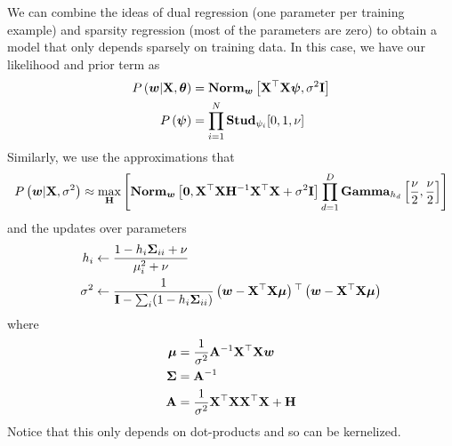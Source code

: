 We can combine the ideas of dual regression (one parameter per training example) and sparsity regression (most of the parameters are zero) to obtain a model that only depends sparsely on training data. In this case, we have our likelihood and prior term as
\begin{align*}
	P\left(\boldsymbol{w}|\mathbf{X},\boldsymbol{\theta}\right)&=\mathbf{Norm}_{\boldsymbol{w}}\left[\mathbf{X}^\top\mathbf{X}\boldsymbol{\psi},\sigma^2\mathbf{I}\right] \\
	P\left(\boldsymbol{\psi}\right)&=\prod_{i=1}^N\mathbf{Stud}_{\psi_i}[0,1,\nu]
\end{align*}
Similarly, we use the approximations that
\begin{align*}
	P\left(\boldsymbol{w}|\mathbf{X},\sigma^2\right)\approx\max_{\mathbf{H}}\left[\mathbf{Norm}_{\boldsymbol{w}}\left[\boldsymbol{0},\mathbf{X}^\top\mathbf{X}\mathbf{H}^{-1}\mathbf{X}^\top\mathbf{X}+\sigma^2\mathbf{I}\right]\prod_{d=1}^D\mathbf{Gamma}_{h_d}\left[\frac{\nu}{2},\frac{\nu}{2}\right]\right]
\end{align*}
and the updates over parameters
\begin{align*}
	h_i&\gets\frac{1-h_i\mathbf{\Sigma}_{ii}+\nu}{\mu_i^2+\nu} \\
	\sigma^2&\gets\frac{1}{\mathbf{I}-\sum_i(1-h_i\mathbf{\Sigma}_{ii})}\left(\boldsymbol{w}-\mathbf{X}^\top\mathbf{X}\boldsymbol{\mu}\right){}^\top\left(\boldsymbol{w}-\mathbf{X}^\top\mathbf{X}\boldsymbol{\mu}\right)
\end{align*}
where
\begin{align*}
	\boldsymbol{\mu}&=\frac{1}{\sigma^2}\mathbf{A}^{-1}\mathbf{X}^\top\mathbf{X}\boldsymbol{w} \\
	\mathbf{\Sigma}&=\mathbf{A}^{-1} \\
	\mathbf{A}&=\frac{1}{\sigma^2}\mathbf{X}^\top\mathbf{X}\mathbf{X}^\top\mathbf{X}+\mathbf{H}
\end{align*}
Notice that this only depends on dot-products and so can be kernelized.
